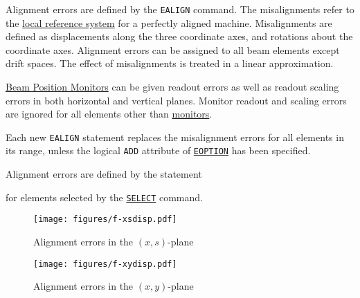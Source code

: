 Alignment errors are defined by the \texttt{EALIGN} command. 
The misalignments refer to the
\hyperref[sec:reference]{local reference system} for a
perfectly aligned machine.  
Misalignments are defined as displacements along the three coordinate
axes, and rotations about the coordinate axes. 
Alignment errors can be assigned to all beam elements except drift
spaces. 
The effect of misalignments is treated in a linear
approximation.

\hyperref[sec:monitor]{Beam Position Monitors} can be given readout errors as 
well as readout scaling errors in both horizontal and vertical planes. 
Monitor readout and scaling errors are ignored for all elements other than 
\hyperref[sec:monitor]{monitors}.

Each new \texttt{EALIGN} statement replaces the misalignment errors for all 
elements in its range, unless the logical \texttt{ADD} attribute of 
\hyperref[sec:eoption]{\texttt{EOPTION}} has been specified.

Alignment errors are defined by the statement 

for elements selected by the
\hyperref[sec:select]{\texttt{SELECT}} command. 

\begin{figure}[ht]
	\centering
	\setlength{\unitlength}{1pt}
	\texttt{[image: figures/f-xsdisp.pdf]}
	\caption{Alignment errors in the $(x,s)$-plane}
	\label{F-XSDISP}
\end{figure}

\begin{figure}[htb]
	\centering
	\setlength{\unitlength}{1pt}
	\texttt{[image: figures/f-xydisp.pdf]}
	\caption{Alignment errors in the $(x,y)$-plane}
	\label{F-XYDISP}
\end{figure}

